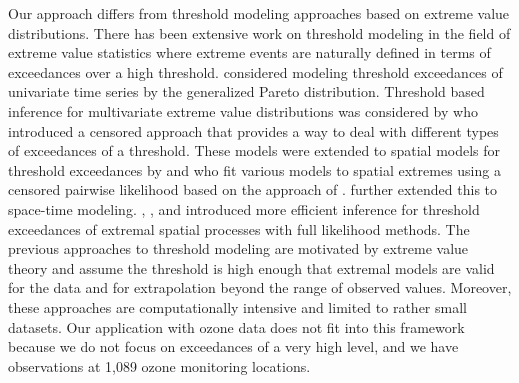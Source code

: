 Our approach differs from threshold modeling approaches based on extreme value distributions.
There has been extensive work on threshold modeling in the field of extreme value statistics where extreme events are naturally defined in terms of exceedances over a high threshold.
\citet{Davison1990} considered modeling threshold exceedances of univariate time series by the generalized Pareto distribution.
Threshold based inference for multivariate extreme value distributions was considered by \citet{Ledford1996} who introduced a censored approach that provides a way to deal with different types of exceedances of a threshold.
These models were extended to spatial models for threshold exceedances by \citet{Wadsworth2012} and \citet{Thibaud2013} who fit various models to spatial extremes using a censored pairwise likelihood \citep{Padoan2010} based on the approach of \citet{Ledford1996}.
\citet{Huser2014} further extended this to space-time modeling.
\citet{Wadsworth2014}, \citet{Engelke2015}, and \citet{Thibaud2013a} introduced more efficient inference for threshold exceedances of extremal spatial processes with full likelihood methods.
The previous approaches to threshold modeling are motivated by extreme value theory and assume the threshold is high enough that extremal models are valid for the data and for extrapolation beyond the range of observed values.
Moreover, these approaches are computationally intensive and limited to rather small datasets.
Our application with ozone data does not fit into this framework because we do not focus on exceedances of a very high level, and we have observations at 1,089 ozone monitoring locations.

